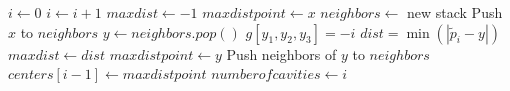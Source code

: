 \begin{enumerate}
{\begin{algorithmic}
\State $i\gets 0$
        \State $i \gets i+1$
        \State $maxdist \gets -1$
        \State $maxdistpoint \gets x$
        \State $neighbors \gets$ new stack
        \State Push $x$ to $neighbors$
            \State $y \gets neighbors.pop()$
                \State $g[y_1,y_2,y_3] = -i$
                \State $dist = \min(|\tilde{p}_i - y|)$
                    \State $maxdist \gets dist$
                    \State $maxdistpoint \gets y$
                \EndIf
                \State Push neighbors of $y$ to $neighbors$
            \EndIf
        \EndWhile
        \State $centers[i-1] \gets maxdistpoint$
    \EndIf
\EndFor
\State $numberofcavities \gets i$
\end{algorithmic}





}
\end{enumerate}
